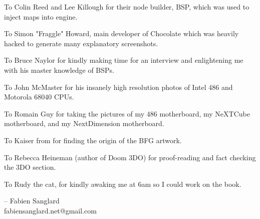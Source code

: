 \par
To Colin Reed and Lee Killough for their node builder, BSP, which was used to inject maps into \doom{} engine.\\
\par
To Simon "Fraggle" Howard, main developer of Chocolate \doom{} which was heavily hacked to generate many explanatory screenshots.\\
\par
To Bruce Naylor for kindly making time for an interview and enlightening me with his master knowledge of BSPs.\\
\par
To John McMaster for his insanely high resolution photos of Intel 486 and Motorola 68040 CPUs.\\
\par
To Romain Guy for taking the pictures of my 486 motherboard, my NeXTCube motherboard, and my NextDimension motherboard.\\
\par
To Kaiser from  for finding the origin of the BFG artwork.\\
\par
To Rebecca Heineman (author of Doom 3DO) for proof-reading and fact checking the 3DO section.\\
\par
To Rudy the cat, for kindly awaking me at 6am so I could work on the book.\\
\par
-- Fabien Sanglard\\
fabiensanglard.net@gmail.com
